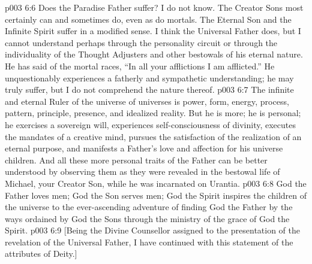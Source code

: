 \vs p003 6:6 \pc Does the Paradise Father suffer? I do not know. The Creator Sons most certainly can and sometimes do, even as do mortals. The Eternal Son and the Infinite Spirit suffer in a modified sense. I think the Universal Father does, but I cannot understand  perhaps through the personality circuit or through the individuality of the Thought Adjusters and other bestowals of his eternal nature. He has said of the mortal races, “In all your afflictions I am afflicted.” He unquestionably experiences a fatherly and sympathetic understanding; he may truly suffer, but I do not comprehend the nature thereof.
\vs p003 6:7 \pc The infinite and eternal Ruler of the universe of universes is power, form, energy, process, pattern, principle, presence, and idealized reality. But he is more; he is personal; he exercises a sovereign will, experiences self\hyp{}consciousness of divinity, executes the mandates of a creative mind, pursues the satisfaction of the realization of an eternal purpose, and manifests a Father’s love and affection for his universe children. And all these more personal traits of the Father can be better understood by observing them as they were revealed in the bestowal life of Michael, your Creator Son, while he was incarnated on Urantia.
\vs p003 6:8 \pc God the Father loves men; God the Son serves men; God the Spirit inspires the children of the universe to the ever\hyp{}ascending adventure of finding God the Father by the ways ordained by God the Sons through the ministry of the grace of God the Spirit.
\vsetoff
\vs p003 6:9 [Being the Divine Counsellor assigned to the presentation of the revelation of the Universal Father, I have continued with this statement of the attributes of Deity.]

